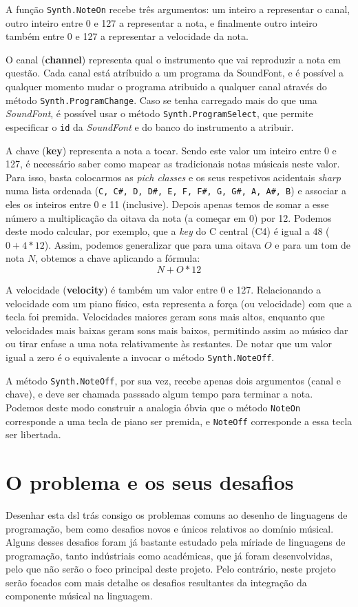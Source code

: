 \documentclass[
  oneside,
  11pt, a4paper,
  footinclude=true,
  headinclude=true,
  cleardoublepage=empty
]{scrbook}
\begin{document}
A função \texttt{Synth.NoteOn} recebe três argumentos: um inteiro a representar o canal, outro inteiro entre 0 e 127 a representar a nota, e finalmente outro inteiro também entre 0 e 127 a representar a velocidade da nota.

O canal (\textbf{channel}) representa qual o instrumento que vai reproduzir a nota em questão. Cada canal está atríbuido a um programa da SoundFont, e é possível a qualquer momento mudar o programa atribuido a qualquer canal através do método \texttt{Synth.ProgramChange}. Caso se tenha carregado mais do que uma \textit{SoundFont}, é possível usar o método \texttt{Synth.ProgramSelect}, que permite especificar o \texttt{id} da \textit{SoundFont} e do banco do instrumento a atribuir.

A chave (\textbf{key}) representa a nota a tocar. Sendo este valor um inteiro entre 0 e 127, é necessário saber como mapear as tradicionais notas músicais neste valor. Para isso, basta colocarmos as \textit{pich classes} e os seus respetivos acidentais \textit{sharp} numa lista ordenada (\verb|C, C#, D, D#, E, F, F#, G, G#, A, A#, B|) e associar a eles os inteiros entre 0 e 11 (inclusive). Depois apenas temos de somar a esse número a multiplicação da oitava da nota (a começar em 0) por 12. Podemos deste modo calcular, por exemplo, que a \textit{key} do C central (C4) é igual a 48 ($0 + 4 * 12$). Assim, podemos generalizar que para uma oitava $O$ e para um tom de nota $N$, obtemos a chave aplicando a fórmula:
$$N + O * 12$$

A velocidade (\textbf{velocity}) é também um valor entre 0 e 127. Relacionando a velocidade com um piano físico, esta representa a força (ou velocidade) com que a tecla foi premida. Velocidades maiores geram sons mais altos, enquanto que velocidades mais baixas geram sons mais baixos, permitindo assim ao músico dar ou tirar enfase a uma nota relativamente às restantes. De notar que um valor igual a zero é o equivalente a invocar o método \texttt{Synth.NoteOff}.

A método \texttt{Synth.NoteOff}, por sua vez, recebe apenas dois argumentos (canal e chave), e deve ser chamada passsado algum tempo para terminar a nota. Podemos deste modo construir a analogia óbvia que o método \texttt{NoteOn} corresponde a uma tecla de piano ser premida, e \texttt{NoteOff} corresponde a essa tecla ser libertada.


	\chapter{O problema e os seus desafios}
    Desenhar esta \acrfull{dsl} trás consigo os problemas comuns ao desenho de linguagens de programação, bem como desafios novos e únicos relativos ao domínio músical. Alguns desses desafios foram já bastante estudado pela míriade de linguagens de programação, tanto indústriais como académicas, que já foram desenvolvidas, pelo que não serão o foco principal deste projeto. Pelo contrário, neste projeto serão focados com mais detalhe os desafios resultantes da integração da componente músical na linguagem.
    
\end{document}
